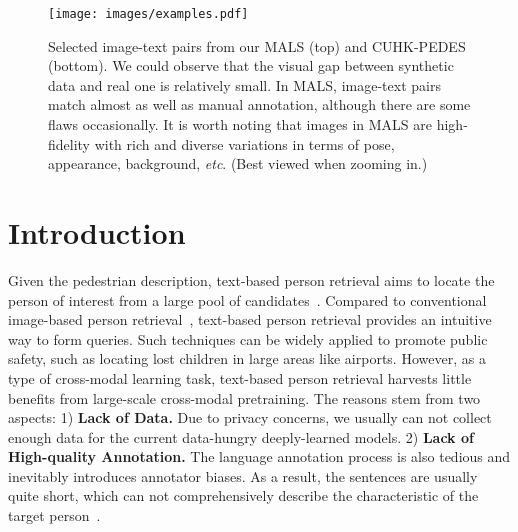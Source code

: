 \documentclass[sigconf]{acmart}
\begin{document}
\maketitle


\begin{figure}[t]
\begin{center}
     \texttt{[image: images/examples.pdf]}     
\end{center}
\vspace{-.20in}
      \caption{Selected image-text pairs from our MALS (top) and CUHK-PEDES (bottom).
      We could observe that the visual gap between synthetic data and real one is relatively small. 
      In MALS, image-text pairs match almost as well as manual annotation, although there are some flaws occasionally. 
      It is worth noting that images in MALS are high-fidelity with rich and diverse variations in terms of pose, appearance, background, \emph{etc}. (Best viewed when zooming in.)
      }\label{fig:examples}
      \vspace{-.20in}
\end{figure}


\section{Introduction}


Given the pedestrian description, text-based person retrieval aims to locate the person of interest from a large pool of candidates~\cite{li2017identity}. 
Compared to conventional image-based person retrieval~\cite{zheng2011person, xiao2016end, liao2015person}, text-based person retrieval provides an intuitive way to form queries. 
Such techniques can be widely applied to promote public safety, such as locating lost children in large areas like airports. 
However, as a type of cross-modal learning task, text-based person retrieval harvests little benefits from large-scale cross-modal pretraining. 
The reasons stem from two aspects: 
1) \textbf{Lack of Data.} Due to privacy concerns, we usually can not collect enough data for the current data-hungry deeply-learned models. 
2) \textbf{Lack of High-quality Annotation.} The language annotation process is also tedious and inevitably introduces annotator biases.
As a result, the sentences are usually quite short, which can not comprehensively describe the characteristic of the target person~\cite{li2017person, ding2021semantically}. 
\end{document}
